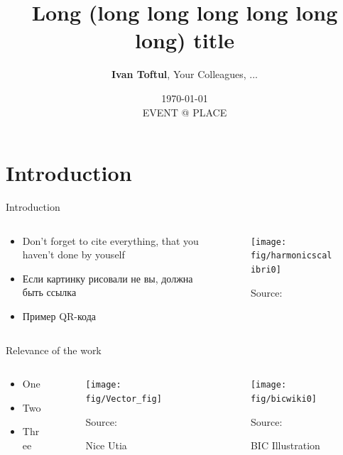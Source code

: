 \documentclass[
aspectratio=169,
16pt,
xcolor={dvipsnames} %
]{beamer}
\title[Short title]{\textbf{Long (long  long long long long long) title}}
\author[Ivan Toftul]{
	\textbf{Ivan Toftul}, 
	Your Colleagues, ...
}
\institute[ITMO]{
	Faculty of Physics, ITMO University \\ 
	\medskip
	\texttt{toftul.ivan@gmail.com} 
}
\date{
	\small{\today \\ EVENT @ PLACE}
}
\newcommand{\green}[1]{\textcolor{green!50!black}{#1}}
\begin{document}
	
\begin{frame}
	\titlepage 
\end{frame}

\section{Introduction}

\begin{frame}[t]{Introduction}
	\begin{columns}
		\begin{column}{0.4\linewidth}
			\begin{itemize}
				\item Don't forget to cite everything, that you haven't done by youself
				\item \green{Если картинку рисовали не вы, должна быть ссылка}
				\item Пример QR-кода 
			\end{itemize}
		\end{column}
		\begin{column}{0.6\linewidth}
			\begin{figure}
				\texttt{[image: fig/harmonicscalibri0]}
				{\raggedright\tiny Source:~\par}
			\end{figure}
		\end{column}
	\end{columns}
\end{frame}

\begin{frame}[t]{Relevance of the work}
	\begin{columns}
		\begin{column}{0.2\linewidth}
			\begin{itemize}
				\item One
				\item Two
				\item Three				
			\end{itemize}
		\end{column}
		\begin{column}{0.3\linewidth}
			\begin{figure}
				\texttt{[image: fig/Vector\_fig]}
				\caption{Nice Utia}
				 {\raggedright\tiny Source: \fullcite{Utia}\par}
			\end{figure}
		\end{column}
		\begin{column}{0.4\linewidth}
			\begin{figure}
				\texttt{[image: fig/bicwiki0]}
				\caption{BIC Illustration}
				 {\raggedright\tiny Source:\fullcite{BICwiki}\par}
			\end{figure}
		\end{column}
	\end{columns}
\end{frame}
\end{document}

